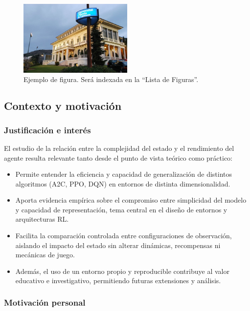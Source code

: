 \documentclass[12pt,a4paper,twoside,openany]{book}
\begin{document}
\begin{figure}[h]
\centering
\includegraphics[width=0.5\textwidth]{./figs/image1.png}
\caption{Ejemplo de figura. Será indexada en la “Lista de Figuras”.}
\label{fig:figura_ejemplo}
\end{figure}

\subsection{Contexto y motivación}

\subsubsection{Justificación e interés}
El estudio de la relación entre la complejidad del estado y el rendimiento del agente resulta relevante tanto desde el punto de vista teórico como práctico:

\begin{itemize}
    \item Permite entender la eficiencia y capacidad de generalización de distintos algoritmos (A2C, PPO, DQN) en entornos de distinta dimensionalidad.
    \item Aporta evidencia empírica sobre el compromiso entre simplicidad del modelo y capacidad de representación, tema central en el diseño de entornos y arquitecturas RL.
    \item Facilita la comparación controlada entre configuraciones de observación, aislando el impacto del estado sin alterar dinámicas, recompensas ni mecánicas de juego.
    \item Además, el uso de un entorno propio y reproducible contribuye al valor educativo e investigativo, permitiendo futuras extensiones y análisis.
\end{itemize}

\subsubsection{Motivación personal}
\end{document}
